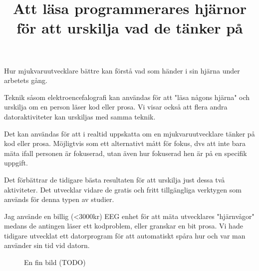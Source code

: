 \documentclass{popsci}
\title{Att läsa programmerares hjärnor för att urskilja vad de tänker på}
\begin{document}


{\noindent \lipsum[1-2]}



Hur mjukvaruutvecklare bättre kan förstå vad som händer i sin hjärna under arbetets gång.

Teknik såsom elektroencefalografi kan användas för att "läsa någons hjärna" och urskilja om en person läser kod eller prosa. Vi visar också att flera andra datoraktiviteter kan urskiljas med samma teknik.

Det kan användas för att i realtid uppskatta om en mjukvaruutvecklare tänker på kod eller prosa. Möjligtvis som ett alternativt mått för fokus, dvs att inte bara mäta ifall personen är fokuserad, utan även hur fokuserad hen är på en specifik uppgift.

Det förbättrar de tidigare bästa resultaten för att urskilja just dessa två aktiviteter.
Det utvecklar vidare de gratis och fritt tillgängliga verktygen som används för denna typen av studier.

Jag använde en billig (<3000kr) EEG enhet för att mäta utvecklares "hjärnvågor" medans de antingen läser ett kodproblem, eller granskar en bit prosa.
Vi hade tidigare utvecklat ett datorprogram för att automatiskt spåra hur och var man använder sin tid vid datorn.

\begin{figure}[!bth] %
\caption{En fin bild (TODO)}
\end{figure}
\end{document}
